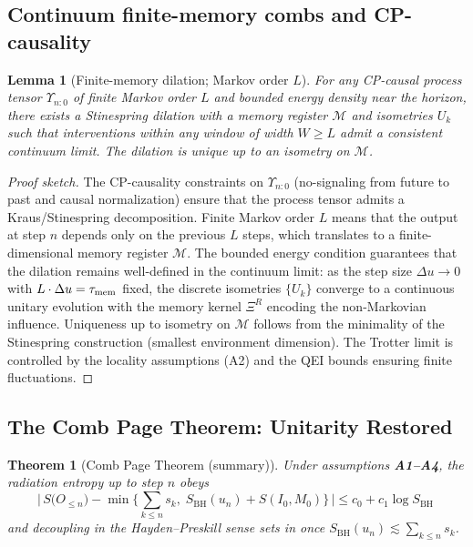 \documentclass[a4paper,11pt]{article}
\newcommand{\SBH}{\ensuremath{S_{\mathrm{BH}}}}
\theoremstyle{plain}
\newtheorem{theorem}{Theorem}
\newtheorem{lemma}{Lemma}
\theoremstyle{definition}
\theoremstyle{remark}
\begin{document}
\subsection*{Continuum finite-memory combs and CP-causality}
\begin{lemma}[Finite-memory dilation; Markov order $L$]\label{lem:finite-memory-dilation}
For any CP-causal process tensor $\Upsilon_{n:0}$ of finite Markov order $L$ and bounded energy density
near the horizon, there exists a Stinespring dilation with a memory register $\mathcal{M}$ and isometries $U_k$
such that interventions within any window of width $W\!\ge\!L$ admit a consistent continuum limit. The dilation
is unique up to an isometry on $\mathcal{M}$.
\end{lemma}
\begin{proof}[Proof sketch]
The CP-causality constraints on $\Upsilon_{n:0}$ (no-signaling from future to past and causal normalization) ensure that the process tensor admits a Kraus/Stinespring decomposition. Finite Markov order $L$ means that the output at step $n$ depends only on the previous $L$ steps, which translates to a finite-dimensional memory register $\mathcal{M}$. The bounded energy condition guarantees that the dilation remains well-defined in the continuum limit: as the step size $\Delta u\to 0$ with $L\cdot\Delta u=\tau_{\rm mem}$ fixed, the discrete isometries $\{U_k\}$ converge to a continuous unitary evolution with the memory kernel $\Xi^R$ encoding the non-Markovian influence. Uniqueness up to isometry on $\mathcal{M}$ follows from the minimality of the Stinespring construction (smallest environment dimension). The Trotter limit is controlled by the locality assumptions (A2) and the QEI bounds ensuring finite fluctuations.
\end{proof}

\subsection{The Comb Page Theorem: Unitarity Restored}
\label{sec:page_theorem}


\begin{theorem}[Comb Page Theorem (summary)]
\label{thm:comb-page-summary}
Under assumptions \textbf{A1--A4}, the radiation entropy up to step \(n\) obeys
\begin{equation}
\label{eq:comb_min_principle}
\Big|\,S\!\big(O_{\le n}\big)
- \min\!\Big\{\sum_{k\le n} s_k,\; S_{\mathrm{BH}}(u_n)+S(I_0,M_0)\Big\}\,\Big|
\le c_0 + c_1\log \SBH \ %
\end{equation}
and decoupling in the Hayden--Preskill sense sets in once
\(S_{\mathrm{BH}}(u_n) \lesssim \sum_{k\le n} s_k\).
\end{theorem}
\end{document}
